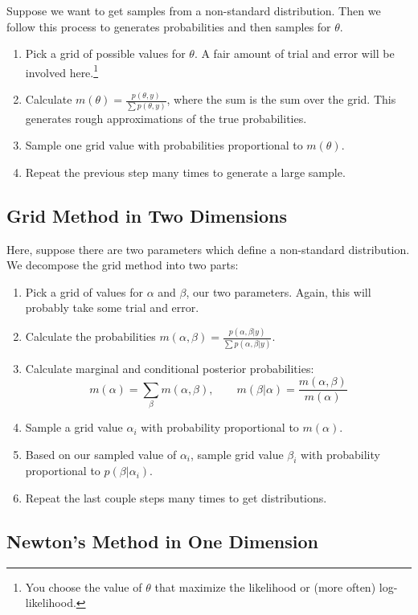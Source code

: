 \documentclass[a4paper,12pt]{scrartcl}
\begin{document}
Suppose we want to get samples from a non-standard distribution. Then
we follow this process to generates probabilities and then samples for 
$\theta$. 
\begin{enumerate}
   \item Pick a grid of possible values for $\theta$. A fair amount
      of trial and error will be involved here.\footnote{You choose
      the value of $\theta$ that maximize the likelihood or
      (more often) log-likelihood.}
   \item Calculate $m(\theta) = \frac{p(\theta, y)}{\sum p(\theta, y)}$,
      where the sum is the sum over the grid. This generates rough
      approximations of the true probabilities.
   \item Sample one grid value with probabilities proportional to 
      $m(\theta)$.
   \item Repeat the previous step many times to generate a large sample.
\end{enumerate}

\subsection{Grid Method in Two Dimensions} 

Here, suppose there are two parameters which define a non-standard
distribution. We decompose the grid method into two parts:
\begin{enumerate}
   \item Pick a grid of values for $\alpha$ and $\beta$, our two 
      parameters. Again, this will probably take some trial and 
      error.
   \item Calculate the probabilities $m(\alpha, \beta) = \frac{ 
      p(\alpha, \beta |y)}{\sum p(\alpha, \beta | y)}$.
   \item Calculate marginal and conditional posterior probabilities:
      \[ m(\alpha) = \sum_\beta m(\alpha, \beta), \qquad 
	 m(\beta|\alpha) = \frac{m(\alpha, \beta)}{m(\alpha)}\]
   \item Sample a grid value $\alpha_i$ with probability proportional
      to $m(\alpha)$. 
   \item Based on our sampled value of $\alpha_i$, sample grid value
      $\beta_i$ with probability proportional to $p(\beta | \alpha_i)$.
   \item Repeat the last couple steps many times to get distributions.
\end{enumerate}

\subsection{Newton's Method in One Dimension}
\end{document}
